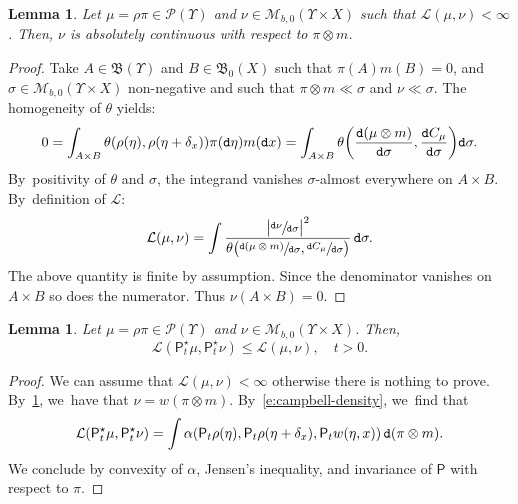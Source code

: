\documentclass[10pt]{amsart}
\newtheorem{lemma}[theorem]{Lemma}
\theoremstyle{definition}
\theoremstyle{remark}
\DeclarePairedDelimiter{\paren}{\lparen}{\rparen}
\DeclarePairedDelimiter{\abs}{\lvert}{\rvert}
\begin{document}
\begin{lemma}\label{t:lagrangian-absolutely-continuous}
Let $\mu = \rho \pi \in \mathscr{P}(\varUpsilon)$ and $\nu \in \mathscr{M}_{b,0}(\varUpsilon \times X)$ such that $\mathcal{L}(\mu, \nu) < \infty$.
Then, $\nu$ is absolutely continuous with respect to $\pi \otimes m$.
\end{lemma}
\begin{proof}
Take $A \in \mathfrak{B}(\varUpsilon)$ and $B \in \mathfrak{B}_{0}(X)$ such that $\pi(A) m(B) = 0$, and $\sigma \in \mathscr{M}_{b,0}(\varUpsilon \times X)$ non-negative and such that $\pi \otimes m \ll \sigma$ and $\nu \ll \sigma$.
The homogeneity of $\theta$ yields:
\begin{equation*}
0 = \int_{A \times B} \theta(\rho(\eta), \rho(\eta + \delta_{x})) \pi(\mathtt{d} \eta) m(\mathtt{d} x) = \int_{A \times B} \theta\paren*{\frac{\mathtt{d} (\mu \otimes m)}{\mathtt{d} \sigma}, \frac{\mathtt{d} C_{\mu}}{\mathtt{d} \sigma}} \mathtt{d} \sigma.
\end{equation*}
By~positivity of $\theta$ and $\sigma$, the integrand vanishes $\sigma$-almost everywhere on $A \times B$.
By~definition of $\mathcal{L}$:
\begin{equation*}
\mathcal{L}(\mu, \nu) = \int \frac{\abs[\big]{\sfrac{\mathtt{d} \nu}{\mathtt{d} \sigma}}^{2}}{\theta\paren[\big]{\sfrac{\mathtt{d} (\mu \otimes m)}{\mathtt{d} \sigma}, \sfrac{\mathtt{d} C_{\mu}}{\mathtt{d} \sigma}}}\, \mathtt{d} \sigma.
\end{equation*}
The above quantity is finite by assumption.
Since the denominator vanishes on $A \times B$ so does the numerator.
Thus $\nu(A \times B) = 0$.
\end{proof}

\begin{lemma}\label{t:contraction-lagrangian}
Let $\mu = \rho \pi \in \mathscr{P}(\varUpsilon)$ and $\nu \in \mathscr{M}_{b,0}(\varUpsilon \times X)$.
Then,
\begin{equation*}
\mathcal{L}(\mathsf{P}^{\star}_{t}\mu, \mathsf{P}^{\star}_{t}\nu) \leq \mathcal{L}(\mu, \nu), \quad t > 0.
\end{equation*}
\end{lemma}

\begin{proof}
We can assume that $\mathcal{L}(\mu, \nu) < \infty$ otherwise there is nothing to prove.
By~\cref{t:lagrangian-absolutely-continuous}, we~have that $\nu = w (\pi \otimes m)$.
By~\cref{e:campbell-density}, we~find that
\begin{equation*}
\mathcal{L}(\mathsf{P}^{\star}_{t}\mu, \mathsf{P}^{\star}_{t} \nu) = \int \alpha\paren*{\mathsf{P}_{t} \rho(\eta), \mathsf{P}_{t} \rho(\eta + \delta_{x}), \mathsf{P}_t w(\eta, x)} \, \mathtt{d} (\pi \otimes m).
\end{equation*}
We conclude by convexity of $\alpha$, Jensen's inequality, and invariance of $\mathsf{P}$ with respect to $\pi$.
\end{proof}
\end{document}
